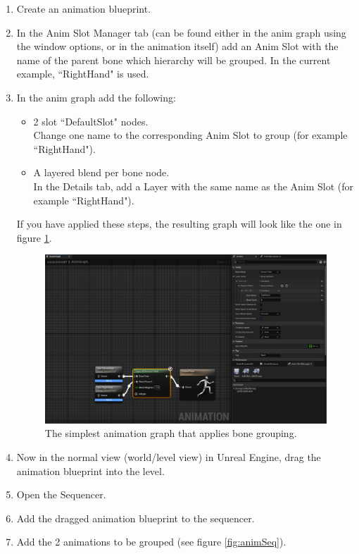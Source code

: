 \documentclass{uva-inf-article}
\begin{document}
\begin{enumerate}
    \item Create an animation blueprint.
    \item In the Anim Slot Manager tab (can be found either in the anim graph using the window options, or in the animation itself) add an Anim Slot with the name of the parent bone which hierarchy will be grouped. In the current example, ``RightHand" is used.
    \item In the anim graph add the following:
    \begin{itemize}
        \item 2 slot ``DefaultSlot" nodes.\\Change one name to the corresponding Anim Slot to group (for example ``RightHand").
        \item A layered blend per bone node.\\In the Details tab, add a Layer with the same name as the Anim Slot (for example ``RightHand").
    \end{itemize}
    If you have applied these steps, the resulting graph will look like the one in figure \ref{fig:boneGrouping}.
    \begin{figure}[hbt!]
        \centering
        \includegraphics[width=.9\textwidth]{imgs/animgraphsimple.png}
        \caption{The simplest animation graph that applies bone grouping.}
        \label{fig:boneGrouping}
    \end{figure}
    \item Now in the normal view (world/level view) in Unreal Engine, drag the animation blueprint into the level.
    \item Open the Sequencer.
    \item Add the dragged animation blueprint to the sequencer.
    \item Add the 2 animations to be grouped (see figure \ref{fig:animSeq}).

\end{enumerate}
\end{document}
